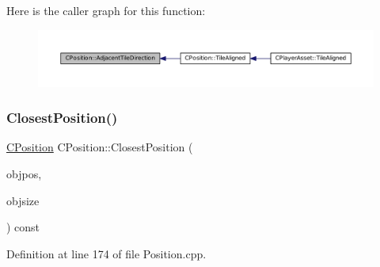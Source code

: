 Here is the caller graph for this function\+:\nopagebreak
\begin{figure}[H]
\begin{center}
\leavevmode
\includegraphics[width=350pt]{classCPosition_a2295901e4c35cfc81304f9a217e34ac7_icgraph}
\end{center}
\end{figure}
\hypertarget{classCPosition_a91fd43eeb2c894bcb7577ae87247b726}{}\label{classCPosition_a91fd43eeb2c894bcb7577ae87247b726} 
\subsubsection{\texorpdfstring{Closest\+Position()}{ClosestPosition()}}
{\footnotesize\ttfamily \hyperlink{classCPosition}{C\+Position} C\+Position\+::\+Closest\+Position (\begin{DoxyParamCaption}\item[{const \hyperlink{classCPosition}{C\+Position} \&}]{objpos,  }\item[{int}]{objsize }\end{DoxyParamCaption}) const}



Definition at line 174 of file Position.\+cpp.


